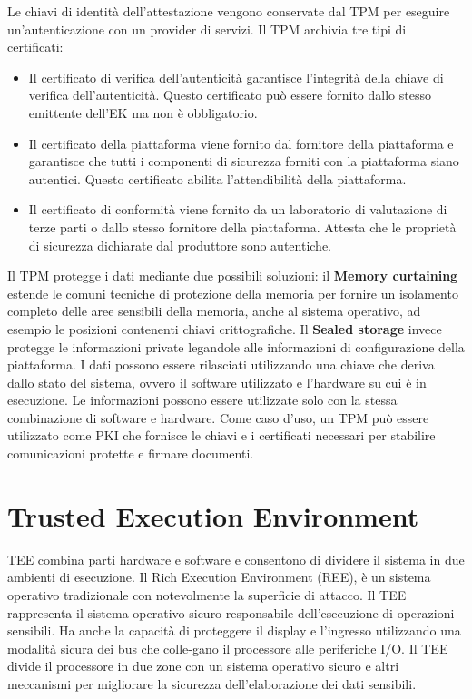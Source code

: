 Le chiavi di identità dell'attestazione vengono conservate dal
TPM per eseguire un'autenticazione con un provider di servizi.
Il TPM archivia tre tipi di certificati:
\begin{itemize}
    \item Il certificato di verifica dell'autenticità garantisce l'integrità
della chiave di verifica dell'autenticità. Questo certificato può
essere fornito dallo stesso emittente dell'EK ma non è
obbligatorio.
    \item Il certificato della piattaforma viene fornito dal fornitore
della piattaforma e garantisce che tutti i componenti di
sicurezza forniti con la piattaforma siano autentici. Questo
certificato abilita l'attendibilità della piattaforma.
    \item Il certificato di conformità viene fornito da un laboratorio di
valutazione di terze parti o dallo stesso fornitore della
piattaforma. Attesta che le proprietà di sicurezza dichiarate
dal produttore sono autentiche.
\end{itemize}
Il TPM protegge i dati mediante due possibili soluzioni: il \textbf{Memory curtaining} estende le comuni tecniche di protezione
della memoria per fornire un isolamento completo delle aree
sensibili della memoria, anche al sistema operativo, ad
esempio le posizioni contenenti chiavi crittografiche. Il \textbf{Sealed storage} invece protegge le informazioni private legandole alle
informazioni di configurazione della piattaforma. I dati possono essere rilasciati utilizzando una chiave che deriva dallo
stato del sistema, ovvero il software utilizzato e l'hardware su
cui è in esecuzione. Le informazioni possono essere utilizzate
solo con la stessa combinazione di software e hardware.
Come caso d'uso, un TPM può essere utilizzato come PKI che
fornisce le chiavi e i certificati necessari per stabilire
comunicazioni protette e firmare documenti.

\section{Trusted Execution Environment}
TEE combina parti hardware e software e consentono di dividere
il sistema in due ambienti di esecuzione.
Il Rich Execution Environment (REE), è
un sistema operativo tradizionale con
notevolmente la superficie di attacco.
Il TEE rappresenta il sistema operativo
sicuro responsabile dell'esecuzione di
operazioni sensibili. Ha anche la
capacità di proteggere il display e
l'ingresso utilizzando una modalità
sicura dei bus che colle-gano il
processore alle periferiche I/O.
Il TEE divide il processore in due zone con un sistema operativo
sicuro e altri meccanismi per migliorare la sicurezza
dell'elaborazione dei dati sensibili.

